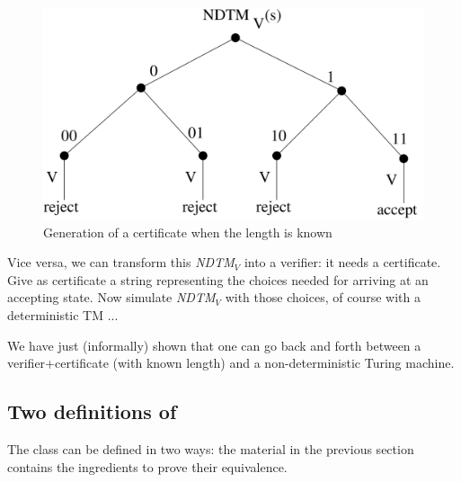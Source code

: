 \begin{figure}[h]
\begin{center}
\includegraphics[height=0.2\textheight,keepaspectratio]{nondetverifier}
\caption{Generation of a certificate when the length is
known}\label{nondetverifier}
\end{center}
\end{figure}

Vice versa, we can transform this {\em NDTM$_V$} into a verifier: it
needs a certificate. Give as certificate a string representing the
choices needed for arriving at an accepting state. Now simulate
{\em NDTM$_V$} with those choices, of course with a deterministic TM
...

We have just (informally) shown that one can go back and forth between
a verifier+certificate (with known length) and a non-deterministic
Turing machine.



\subsection{Two definitions of \NP}

The class \NP can be defined in two ways: the material in the previous
section contains the ingredients to prove their equivalence.


